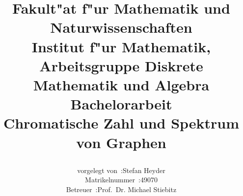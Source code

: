 \documentclass[a4paper,11pt]{article}
\begin{document}
\renewcommand{\baselinestretch}{1.5}\normalsize

\title{
    \begin{figure}[htbp]
        \vspace{-48pt}
        \centering
    \end{figure}\vspace{-16pt}
    \Large Fakult"at f"ur Mathematik und Naturwissenschaften\\
    \vspace{5pt}
    \small Institut f"ur Mathematik, Arbeitsgruppe Diskrete Mathematik und Algebra\\
    \vspace{100pt}
  \Huge {\bf Bachelorarbeit}\\
  \vspace{90pt}
    \huge {\bf Chromatische Zahl und Spektrum von Graphen}\\
    \vspace{100pt}
}

\author{
    \begin{tabular}{rl}
      vorgelegt von~:& Stefan Heyder\\
     Matrikelnummer~:& 49070\\
           Betreuer~:& Prof.~Dr. Michael Stiebitz
\end{tabular}
    \vspace{20pt}
}
\date{\datum}
\maketitle
\thispagestyle{empty}

\newpage
\tableofcontents
\thispagestyle{empty}
\newpage
{}




\newpage
{}


%
%
%
%
\end{document}
